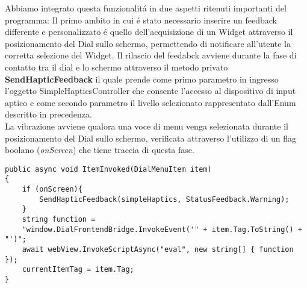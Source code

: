 Abbiamo integrato questa funzionalitá in due aspetti ritenuti importanti del programma:
Il primo ambito in cui é stato necessario inserire un feedback differente e personalizzato é quello dell'acquisizione di un Widget attraverso il posizionamento del Dial sullo schermo, permettendo di notificare all'utente la corretta selezione del Widget.
Il rilascio del feedabck avviene durante la fase di contatto tra il dial e lo schermo attraverso il metodo privato \textbf{SendHapticFeedback} il quale prende come primo parametro in ingresso l'oggetto SimpleHapticsController che consente l'accesso al dispositivo di input aptico e come secondo parametro il livello selezionato rappresentato dall'Enum descritto in precedenza.\\

La vibrazione avviene qualora una voce di menu venga selezionata durante il posizionamento del Dial sullo schermo, verificata attraverso l'utilizzo di un flag boolano (\emph{onScreen}) che tiene traccia di questa fase.

\vspace{1.0cm}
\begin{lstlisting}[caption={Rilascio feedback selezione},style=javaScriptCode]
public async void ItemInvoked(DialMenuItem item)
{
	if (onScreen){
		SendHapticFeedback(simpleHaptics, StatusFeedback.Warning);
	}
	string function = 
	"window.DialFrontendBridge.InvokeEvent('" + item.Tag.ToString() + "')";
	await webView.InvokeScriptAsync("eval", new string[] { function });
	currentItemTag = item.Tag;
} 
\end{lstlisting} 
\vspace{1.0cm}

